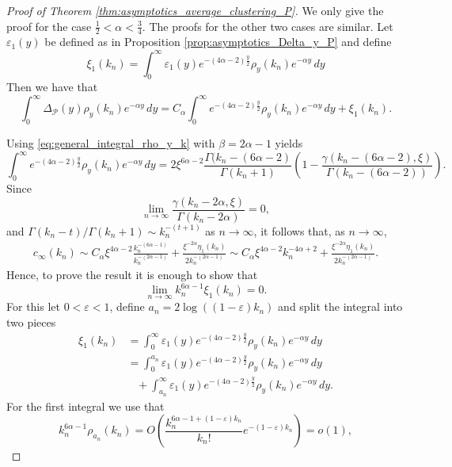 \begin{proof}[Proof of Theorem \ref{thm:asymptotics_average_clustering_P}]

We only give the proof for the case $\frac{1}{2} < \alpha < \frac{3}{4}$. The proofs for the other two cases are similar. Let $\varepsilon_1(y)$ be defined as in Proposition \ref{prop:asymptotics_Delta_y_P} and define
\[
	\xi_1(k_n) = \int_0^{\infty} \varepsilon_1(y) e^{-(4\alpha - 2)\frac{y}{2}} \rho_{y}(k_n) e^{-\alpha y} \, dy
\]
Then we have that
\[
	\int_0^{\infty} \Delta_{\mathcal{P}}(y) \rho_{y}(k_n) e^{-\alpha y} \, dy
	= C_\alpha \int_0^{\infty} e^{-(4\alpha - 2)\frac{y}{2}} \rho_{y}(k_n) e^{-\alpha y} \, dy + \xi_1(k_n).
\]

Using \eqref{eq:general_integral_rho_y_k} with $\beta = 2\alpha - 1$ yields
\[
	\int_0^{\infty} e^{-(4\alpha - 2)\frac{y}{2}} \rho_{y}(k_n) e^{-\alpha y} \, dy 
    = 2\xi^{6\alpha - 2} \frac{\Gamma(k_n-(6\alpha-2)}{\Gamma(k_n+1)}
	\left(1 - \frac{\gamma(k_n - (6\alpha - 2), \xi)}{\Gamma(k_n - (6\alpha-2))}\right).
\]
Since 
\[
	\lim_{n \to \infty} \frac{\gamma(k_n - 2\alpha, \xi)}{\Gamma(k_n - 2\alpha)} = 0,
\]
and $\Gamma(k_n - t)/\Gamma(k_n + 1) \sim k_n^{-(t+1)}$ as $n \to \infty$,
it follows that, as $n \to \infty$,
\begin{align*}
	c_\infty(k_n) \sim C_\alpha \xi^{4\alpha - 2} \frac{k_n^{-(6\alpha - 1)}}{k_n^{-(2\alpha - 1)}}
	+ \frac{\xi^{-2\alpha}\eta_1(k_n)}{2 k_n^{-(2\alpha - 1)}}
	\sim C_\alpha \xi^{4\alpha - 2} k_n^{-4\alpha + 2} 
    + \frac{\xi^{-2\alpha}\eta_1(k_n)}{2 k_n^{-(2\alpha - 1)}}.
\end{align*}
Hence, to prove the result it is enough to show that
\[
	\lim_{n \to \infty} k_n^{6\alpha - 1}\xi_1(k_n) = 0.
\]
For this let $0 < \varepsilon < 1$, define $a_n = 2\log((1-\varepsilon)k_n)$ and split the integral into two pieces
\begin{align*}
	\xi_1(k_n) &= \int_0^{\infty} \varepsilon_1(y) e^{-(4\alpha - 2)\frac{y}{2}} \rho_{y}(k_n) e^{-\alpha y} \, dy\\
	&= \int_0^{a_n} \varepsilon_1(y) e^{-(4\alpha - 2)\frac{y}{2}} \rho_{y}(k_n) e^{-\alpha y} \, dy\\
	&\hspace{10pt}+ \int_{a_n}^{\infty} \varepsilon_1(y) e^{-(4\alpha - 2)\frac{y}{2}} 
    	\rho_{y}(k_n) e^{-\alpha y} \, dy.
\end{align*} 
For the first integral we use that
\[
	k_n^{6\alpha - 1}\rho_{a_n}(k_n) = O\left(\frac{k_n^{6\alpha - 1 + (1-\varepsilon)k_n}}{k_n!} e^{-(1-\varepsilon)k_n}\right) = o(1),
\]
\end{proof}
